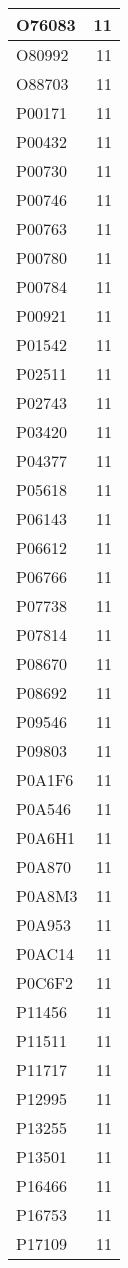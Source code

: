 \documentclass[
]{book}
\theoremstyle{definition}
\theoremstyle{definition}
\theoremstyle{definition}
\theoremstyle{definition}
\theoremstyle{remark}
\begin{document}
\begin{table}
\begin{tabular}{l|r}
\hline
O76083 & 11\\
\hline
O80992 & 11\\
\hline
O88703 & 11\\
\hline
P00171 & 11\\
\hline
P00432 & 11\\
\hline
P00730 & 11\\
\hline
P00746 & 11\\
\hline
P00763 & 11\\
\hline
P00780 & 11\\
\hline
P00784 & 11\\
\hline
P00921 & 11\\
\hline
P01542 & 11\\
\hline
P02511 & 11\\
\hline
P02743 & 11\\
\hline
P03420 & 11\\
\hline
P04377 & 11\\
\hline
P05618 & 11\\
\hline
P06143 & 11\\
\hline
P06612 & 11\\
\hline
P06766 & 11\\
\hline
P07738 & 11\\
\hline
P07814 & 11\\
\hline
P08670 & 11\\
\hline
P08692 & 11\\
\hline
P09546 & 11\\
\hline
P09803 & 11\\
\hline
P0A1F6 & 11\\
\hline
P0A546 & 11\\
\hline
P0A6H1 & 11\\
\hline
P0A870 & 11\\
\hline
P0A8M3 & 11\\
\hline
P0A953 & 11\\
\hline
P0AC14 & 11\\
\hline
P0C6F2 & 11\\
\hline
P11456 & 11\\
\hline
P11511 & 11\\
\hline
P11717 & 11\\
\hline
P12995 & 11\\
\hline
P13255 & 11\\
\hline
P13501 & 11\\
\hline
P16466 & 11\\
\hline
P16753 & 11\\
\hline
P17109 & 11\\

\end{tabular}
\end{table}
\end{document}
